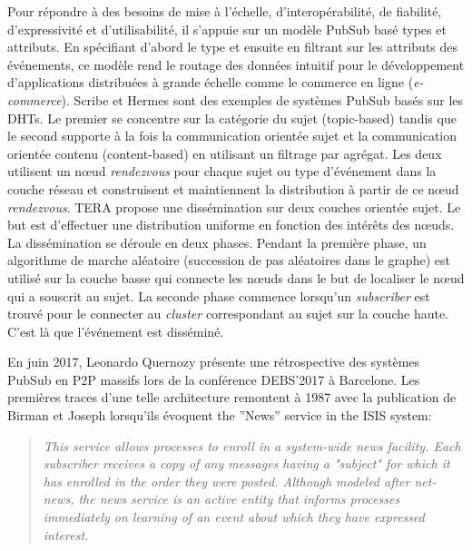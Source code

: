 Pour répondre à des besoins de mise à l'échelle, d'interopérabilité, de fiabilité, 
d'expressivité et d'utilisabilité, il s'appuie sur un modèle \gls{PubSub} basé types 
et attributs. 
En spécifiant d'abord le type et ensuite en filtrant sur les attributs des 
événements, ce modèle rend le routage des données intuitif pour le 
développement d'applications distribuées à grande échelle comme le commerce en 
ligne (\textit{e-commerce}). 
Scribe \cite{Castro2002} et Hermes \cite{Pietzuch2002} sont des exemples de 
systèmes \gls{PubSub} basés sur les \glspl{DHT}. 
Le premier se concentre sur la catégorie du sujet (topic-based) tandis que le second 
supporte à la fois la communication orientée sujet et la communication orientée contenu (content-based) en utilisant un 
filtrage par agrégat. Les deux utilisent un n\oe ud \textit{rendezvous} pour chaque 
sujet ou type d'événement dans la couche réseau et construisent et maintiennent la 
distribution à partir de ce n\oe ud \textit{rendezvous}. TERA \cite{Baldoni2007} 
propose une dissémination sur deux couches orientée sujet. Le but est d'effectuer 
une distribution uniforme en fonction des intérêts des n\oe uds. La dissémination 
se déroule en deux phases. Pendant la première phase, un algorithme de marche aléatoire (succession de pas aléatoires dans le graphe)
est utilisé sur la couche basse qui connecte les n\oe uds dans le but de localiser 
le n\oe ud qui a souscrit au sujet. La seconde phase commence lorsqu'un 
\textit{subscriber} est trouvé pour le connecter au \textit{cluster} correspondant au 
sujet sur la couche haute. C'est là que l'événement est disséminé.

En juin 2017, Leonardo Quernozy présente une rétrospective des systèmes 
\gls{PubSub} en \gls{P2P} massifs lors de la conférence DEBS'2017 à 
Barcelone. 
Les premières traces d'une telle architecture remontent à 1987 avec 
la publication de Birman et Joseph \cite{Birman1987} lorsqu'ils évoquent \og 
the ''News'' service in the ISIS system\fg{}:

\blockcquote{Birman1987}{
	\og\textit{ This service allows processes to enroll in a 
		system-wide news facility. Each subscriber receives a
		copy of any messages having a "subject" for which it 
		has enrolled in the order they were posted. Although 
		modeled after net-news, the news service is an active 
		entity that informs processes immediately on learning 
		of an event about which they have expressed interest.}\fg{}
}

